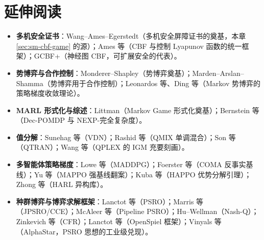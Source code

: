\section*{延伸阅读}
\begin{itemize}
  \item \textbf{多机安全证书}：Wang--Ames--Egerstedt\cite{wang2017safety}（多机安全屏障证书的奠基，本章 \cref{sec:sm-cbf-game} 的源）；Ames 等\cite{ames2017cbf}（CBF 与控制 Lyapunov 函数的统一框架）；GCBF+\cite{zhang2025gcbfplus}（神经图 CBF，可扩展安全的代表）。
  \item \textbf{势博弈与合作控制}：Monderer--Shapley\cite{monderer1996potential}（势博弈奠基）；Marden--Arslan--Shamma\cite{marden2009cooperative}（势博弈用于合作控制）；Leonardos 等\cite{leonardos2022mpg}、Ding 等\cite{ding2022mpg}（Markov 势博弈的策略梯度收敛理论）。
  \item \textbf{MARL 形式化与综述}：Littman\cite{littman1994markov}（Markov Game 形式化奠基）；Bernstein 等\cite{bernstein2002decpomdp}（Dec-POMDP 与 NEXP-完全复杂度）。
  \item \textbf{值分解}：Sunehag 等\cite{sunehag2018vdn}（VDN）；Rashid 等\cite{rashid2018qmix}（QMIX 单调混合）；Son 等\cite{son2019qtran}（QTRAN）；Wang 等\cite{wang2021qplex}（QPLEX 的 IGM 充要刻画）。
  \item \textbf{多智能体策略梯度}：Lowe 等\cite{lowe2017maddpg}（MADDPG）；Foerster 等\cite{foerster2018coma}（COMA 反事实基线）；Yu 等\cite{yu2022mappo}（MAPPO 强基线翻案）；Kuba 等\cite{kuba2022happo}（HAPPO 优势分解引理）；Zhong 等\cite{zhong2024harl}（HARL 异构库）。
  \item \textbf{种群博弈与博弈求解框架}：Lanctot 等\cite{lanctot2017psro}（PSRO）；Marris 等\cite{marris2021jpsro}（JPSRO/CCE）；McAleer 等\cite{mcaleer2020pipeline}（Pipeline PSRO）；Hu--Wellman\cite{hu2003nashq}（Nash-Q）；Zinkevich 等\cite{zinkevich2008cfr}（CFR）；Lanctot 等\cite{lanctot2019openspiel}（OpenSpiel 框架）；Vinyals 等\cite{vinyals2019alphastar}（AlphaStar，PSRO 思想的工业级兑现）。
\end{itemize}

